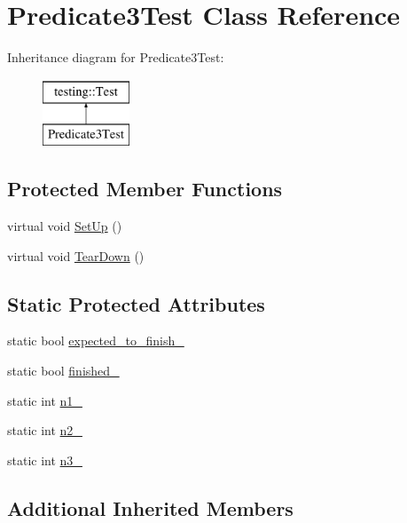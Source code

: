 \hypertarget{class_predicate3_test}{\section{Predicate3\-Test Class Reference}
\label{class_predicate3_test}
}
Inheritance diagram for Predicate3\-Test\-:\begin{figure}[H]
\begin{center}
\leavevmode
\includegraphics[height=2.000000cm]{class_predicate3_test}
\end{center}
\end{figure}
\subsection*{Protected Member Functions}
\begin{DoxyCompactItemize}
\item 
virtual void \hyperlink{class_predicate3_test_a92aad9566e0737b6739d1db14e7912be}{Set\-Up} ()
\item 
virtual void \hyperlink{class_predicate3_test_aa4dc395bded849b6e5175566d791aba7}{Tear\-Down} ()
\end{DoxyCompactItemize}
\subsection*{Static Protected Attributes}
\begin{DoxyCompactItemize}
\item 
static bool \hyperlink{class_predicate3_test_a42c11555410ee89bf6e59d39336a212c}{expected\-\_\-to\-\_\-finish\-\_\-}
\item 
static bool \hyperlink{class_predicate3_test_aa2ef0fa6aed09d872fb9ae36961b49eb}{finished\-\_\-}
\item 
static int \hyperlink{class_predicate3_test_ac232320a93f0c1e09886148a3e1929a5}{n1\-\_\-}
\item 
static int \hyperlink{class_predicate3_test_a11049ef16bcaadc8262faf7349c7676e}{n2\-\_\-}
\item 
static int \hyperlink{class_predicate3_test_afc1df6b079ffe22b87479b161d2ad2f7}{n3\-\_\-}
\end{DoxyCompactItemize}
\subsection*{Additional Inherited Members}


